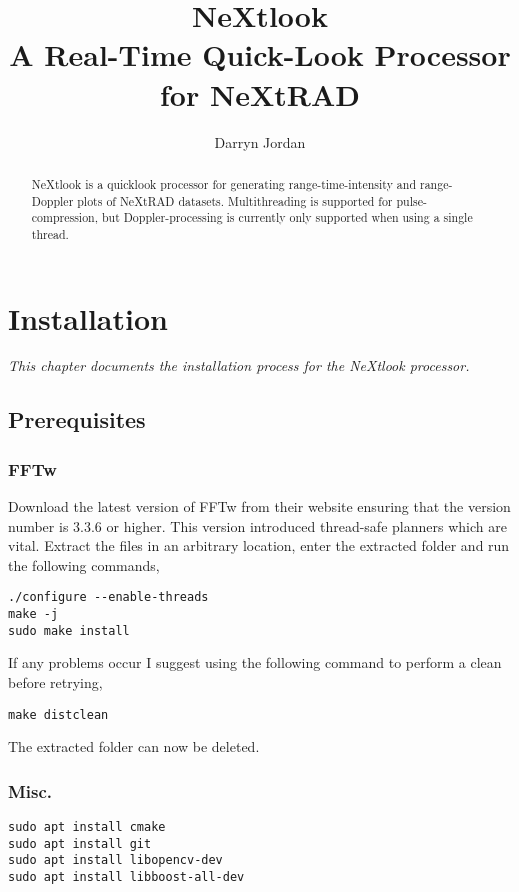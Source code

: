 \documentclass[a4paper,11pt]{report}
\title{NeXtlook\\ A Real-Time Quick-Look Processor for NeXtRAD}
\author{Darryn Jordan}
\begin{document}
\maketitle
\tableofcontents

\begin{abstract}
NeXtlook is a quicklook processor for generating range-time-intensity and range-Doppler plots of NeXtRAD datasets. Multithreading is supported for pulse-compression, but Doppler-processing is currently only supported when using a single thread.
\end{abstract}

\chapter{Installation}
\textit{This chapter documents the installation process for the NeXtlook processor.}
\section{Prerequisites}
\subsection{FFTw}
Download the latest version of FFTw from their website ensuring that the version number is 3.3.6 or higher. This version introduced thread-safe planners which are vital. 
Extract the files in an arbitrary location, enter the extracted folder and run the following commands,
\begin{lstlisting}
./configure --enable-threads
make -j
sudo make install
\end{lstlisting}
If any problems occur I suggest using the following command to perform a clean before retrying,
\begin{lstlisting}
make distclean
\end{lstlisting}
The extracted folder can now be deleted.
\subsection{Misc.}
\begin{lstlisting}
sudo apt install cmake
sudo apt install git
sudo apt install libopencv-dev
sudo apt install libboost-all-dev
\end{lstlisting}
\end{document}
